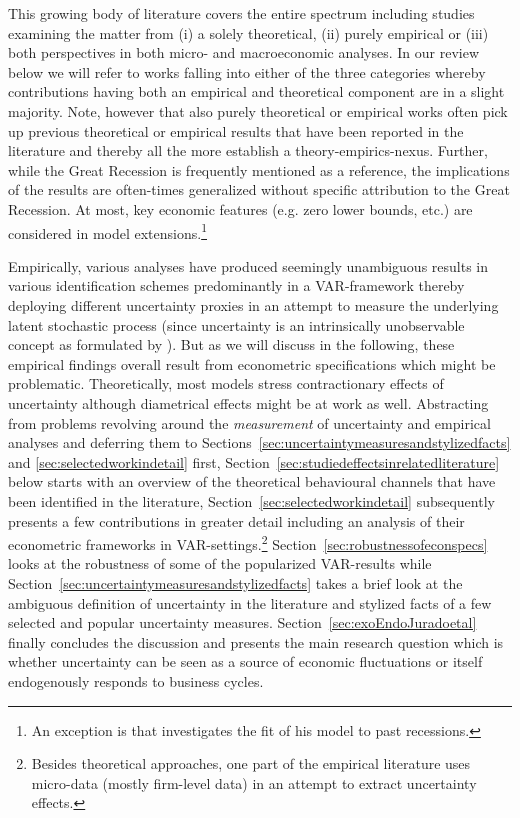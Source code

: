 \documentclass[a4paper,11pt,listof=nochaptergap,oneside,pointednumbers,bibtotoc,bigheadings,liststotoc,hidelinks]{scrbook}
\theoremstyle{mysatz}
\theoremstyle{mydefinition}
\theoremstyle{mytheorem}
\theoremstyle{mybemerkung}
\begin{document}
This growing body of literature covers the entire spectrum including studies examining the matter from (i) a solely theoretical, (ii) purely empirical or (iii) both perspectives in both micro- and macroeconomic analyses. In our review below we will refer to works falling into either of the three categories whereby contributions having both an empirical and theoretical component are in a slight majority.  Note, however that also purely theoretical or empirical works often pick up previous theoretical or empirical results that have been reported in the literature and thereby all the more establish a theory-empirics-nexus. Further, while the Great Recession is frequently mentioned as a reference, the implications of the results are often-times generalized without specific attribution to the Great Recession. At most, key economic features (e.g. zero lower bounds, etc.) are considered in model extensions.\footnote{An exception is \citet{schaal:17} that investigates the fit of his model to past recessions.} 

Empirically, various analyses have produced seemingly unambiguous results in various identification schemes predominantly in a VAR-framework thereby deploying different uncertainty proxies in an attempt to measure the underlying latent stochastic process (since uncertainty is an intrinsically unobservable concept as formulated by \citealp{bloom:14}). But as we will discuss in the following, these empirical findings overall result from econometric specifications which might be problematic. Theoretically, most models stress contractionary effects of uncertainty although diametrical effects might be at work as well. Abstracting from problems revolving around the \textit{measurement} of uncertainty and empirical analyses and deferring them to Sections~\ref{sec:uncertaintymeasuresandstylizedfacts} and \ref{sec:selectedworkindetail} first, Section~\ref{sec:studiedeffectsinrelatedliterature} below starts with an overview of the theoretical behavioural channels that have been identified in the literature, Section~\ref{sec:selectedworkindetail} subsequently presents a few contributions in greater detail including an analysis of their econometric frameworks in VAR-settings.\footnote{Besides theoretical approaches, one part of the empirical literature uses micro-data (mostly firm-level data) in an attempt to extract uncertainty effects.} Section~\ref{sec:robustnessofeconspecs} looks at the robustness of some of the popularized VAR-results while Section~\ref{sec:uncertaintymeasuresandstylizedfacts} takes a brief look at the ambiguous definition of uncertainty in the literature and stylized facts of a few selected and popular uncertainty measures. Section~\ref{sec:exoEndoJuradoetal} finally concludes the discussion and presents the main research question which is whether uncertainty can be seen as a source of economic fluctuations or itself endogenously responds to business cycles.
\end{document}
